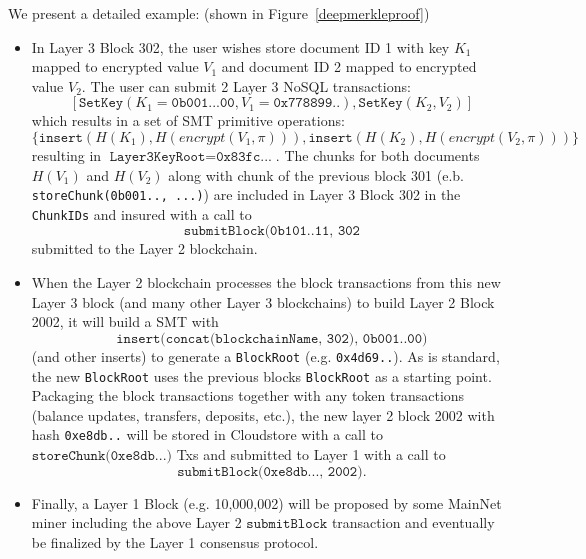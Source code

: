\documentclass{article}
\newcommand{\databaseencryptionkey}{\pi}
\newcommand{\hash}[1]{H(#1)}
\newcommand{\encrypt}[1]{encrypt(#1, \databaseencryptionkey)}
\begin{document}
We present a detailed example: (shown in Figure~\ref{deepmerkleproof})
\begin{itemize}
\item In Layer 3 Block 302, the user wishes store document ID 1 with key $K_1$ mapped to encrypted value $V_1$ and document ID 2 mapped to encrypted value $V_2$. The user can submit 2 Layer 3 NoSQL transactions:
\begin{equation*}
\left[ \texttt{SetKey}(K_1=\texttt{0b001...00},V_1=\texttt{0x778899..}),
\texttt{SetKey}(K_2, V_2)
\right]
\end{equation*}
\noindent which results in a set of SMT primitive operations:
\begin{equation*}
\{\texttt{insert}(\hash{K_1},\hash{\encrypt{V_1}}),  \texttt{insert}(\hash{K_2},\hash{\encrypt{V_2}}) \}
\end{equation*}
resulting in
$\texttt{Layer3KeyRoot}=\texttt{0x83fc...}$.  The chunks for both documents $H(V_1)$ and $H(V_2)$ along with chunk of the previous block 301  (e.b. \texttt{storeChunk(0b001.., ...)}) are included in Layer 3 Block 302 in the \texttt{ChunkIDs} and insured with a call to \[
\texttt{submitBlock(0b101..11, 302}
\]
submitted to the Layer 2 blockchain.

\item When the Layer 2 blockchain processes the block transactions from this new Layer 3 block (and many other Layer 3 blockchains) to build Layer 2 Block 2002, it will build a SMT with
\[
\texttt{insert(concat(blockchainName, 302), 0b001..00)}
\]
(and other inserts) to generate a \texttt{BlockRoot} (e.g. \texttt{0x4d69..}).  As is standard, the new \texttt{BlockRoot} uses the previous blocks \texttt{BlockRoot} as a starting point.  Packaging the block transactions together with any token transactions (balance updates, transfers, deposits, etc.), the new layer 2 block 2002 with hash \texttt{0xe8db..} will be stored in Cloudstore with a call to $\texttt{storeChunk(0xe8db...)}$
Txs and submitted to Layer 1 with a call to
\[
\texttt{submitBlock(0xe8db..., 2002)}.
\]
\item Finally, a Layer 1 Block (e.g. 10,000,002) will be proposed by some MainNet miner including the above Layer 2 $\texttt{submitBlock}$ transaction and eventually be finalized by the Layer 1 consensus protocol.
\end{itemize}
\end{document}
